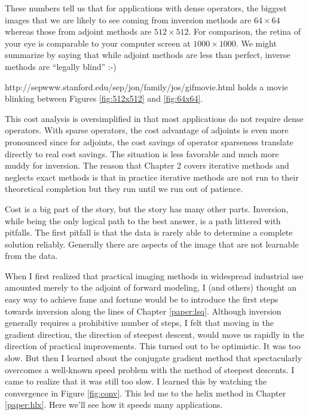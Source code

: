 \par\noindent
These numbers tell us that for applications with dense operators,
the biggest images that we are likely to see coming from inversion methods
are $64\times 64$ whereas those from adjoint methods are $512\times 512$.
For comparison, the retina of your eye is comparable to your computer
screen at $1000\times 1000$.
We might summarize by saying that while adjoint methods are less than perfect,
inverse methods are ``legally blind'' :-)

\par\noindent
http://sepwww.stanford.edu/sep/jon/family/jos/gifmovie.html holds a movie
blinking between Figures \ref{fig:512x512} and \ref{fig:64x64}.
\par
This cost analysis is oversimplified in that most applications
do not require dense operators.
With sparse operators, the cost advantage of adjoints is even more
pronounced since for adjoints,
the cost savings of operator sparseness translate directly to
real cost savings.
The situation is less favorable and much more muddy for inversion.
The reason that Chapter 2 covers iterative methods
and neglects exact methods is that in practice
iterative methods are not run to their theoretical completion
but they run until we run out of patience.

\par
Cost is a big part of the story, but the story has many other parts.
Inversion, while being the only logical path to the best answer,
is a path littered with pitfalls.
The first pitfall is that the data is rarely able to 
determine a complete solution reliably.
Generally there are aspects of the image that are not learnable
from the data.



When I first realized that practical imaging methods in widespread
industrial use amounted merely to the adjoint of forward modeling,
I (and others) thought an easy way to achieve fame and fortune
would be to introduce the first steps towards inversion
along the lines of Chapter \ref{paper:lsq}.
Although inversion generally requires a prohibitive number
of steps, I felt that moving in the gradient direction,
the direction of steepest descent, would move us rapidly
in the direction of practical improvements.
This turned out to be optimistic.
It was too slow.
But then I learned about the conjugate gradient method that
spectacularly overcomes a well-known speed problem with the
method of steepest descents.
I came to realize that it was still too slow.
I learned this by watching the convergence in Figure
\ref{fig:conv}.
This led me to the helix method in Chapter \ref{paper:hlx}.
Here we'll see how it speeds many applications.

